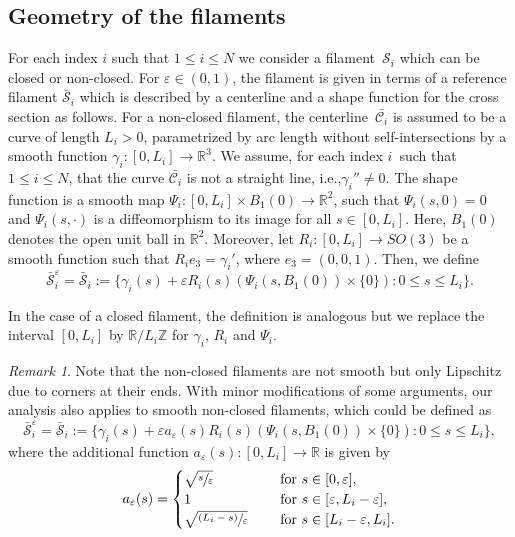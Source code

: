 \documentclass[11pt]{article}
\newcommand{\ie}{i.e.,\xspace}
\newcommand{\psfrac}[2]{\sfrac{(#1)}{#2}}
\newcommand{\R}{\mathbb{R}}
\newcommand{\Z}{\mathbb{Z}}
\let\eps\varepsilon
\theoremstyle{definition}
\theoremstyle{remark}
\newtheorem{remark}[thm]{Remark}
\begin{document}
\subsection{Geometry of the filaments}
For each index $i$ such that $ 1\leq i \leq N$
we consider a filament~$\mathcal S_i$ which can be closed or non-closed.
For $\eps \in (0,1)$, the filament is given in terms of a reference filament $\bar{\mathcal S}_i$ which is described by a centerline and a shape function for the cross section as follows.
For a non-closed filament, the centerline~$\bar {\mathcal C_i}$ is assumed to be a curve of length $L_i >0$, parametrized by arc length without self-intersections by a smooth function $\gamma_i \colon [0,L_i] \to \R^3$.
We assume, for each index $i$~such that $1\leq i \leq N$, that the curve $\bar {\mathcal C_i}$
is not a straight line, \ie $\gamma_i'' \neq 0$.
The shape function is a smooth map $\Psi_i \colon [0,L_i] \times B_1(0) \to \R^2$, such that $\Psi_i(s,0) = 0$ and
$\Psi_i(s,\cdot)$ is a diffeomorphism to its image for all $s \in [0,L_i]$. Here, $B_1(0)$ denotes the open unit ball in $\R^2$. Moreover, let $R_i \colon [0,L_i] \to SO(3)$ be a smooth function such that $R_i e_3 = \gamma_i'$, where $e_3=(0,0,1)$.
Then, we define
\begin{equation} \label{def:S^eps}
{\bar{ \mathcal S}_i^\eps}= \bar{ \mathcal S}_i := \{ \gamma_i(s) + \eps R_i(s)(\Psi_i(s,B_1(0)) \times \{0\}) : 0 \leq s \leq L_i \}.
\end{equation}

In the case of a closed filament, the definition is analogous but we replace the interval $[0,L_i]$ by $\R/L_i \Z$ for $\gamma_i$, $R_i$ and $ \Psi_i$.

\begin{remark} \label{rem:nonclosed.smooth}
Note that the non-closed filaments are not smooth but only Lipschitz due to corners at their ends. With minor modifications of some arguments, our analysis also applies to smooth non-closed filaments, which could be defined as
\begin{equation}
{\bar{ \mathcal S}_i^\eps} = \bar{ \mathcal S}_i := \{ \gamma_i(s) + \eps a_\eps(s) R_i(s)(\Psi_i(s,B_1(0)) \times \{0\}) : 0 \leq s \leq L_i \},
\end{equation}
where the additional function $a_\eps(s) : [0,L_i] \to \R$ is given by
\begin{equation}
a_\eps(s) = \begin{cases}
\sqrt{\sfrac s \eps} &\quad \text { for } s \in [0,\eps], \\
1 &\quad \text { for } s \in [\eps, L_i - \eps], \\
\sqrt{\psfrac{L_i - s}{\eps}} & \quad \text{ for } s \in [L_i-\eps,L_i].
\end{cases}
\end{equation}
\end{remark}
\end{document}
